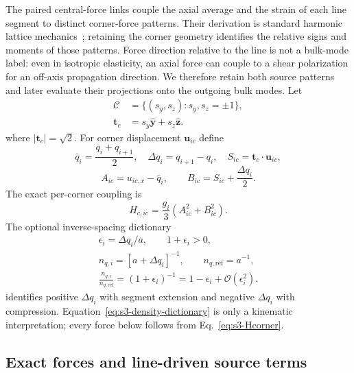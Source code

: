 \documentclass[10pt,aps,pre,reprint,floatfix,notitlepage,nofootinbib]{revtex4-2}
\newcommand{\vu}{\bm{u}}
\newcommand{\vt}{\bm{t}}
\newcommand{\ey}{\hat{\bm{y}}}
\newcommand{\ez}{\hat{\bm{z}}}
\newcommand{\order}{\mathcal O}
\newcommand{\Cc}{\mathcal C}
\begin{document}
The paired central-force links couple the axial average and the strain of each line segment to distinct corner-force patterns. Their derivation is standard harmonic lattice mechanics~\cite{BornHuang1954,Maradudin1971}; retaining the corner geometry identifies the relative signs and moments of those patterns. Force direction relative to the line is not a bulk-mode label: even in isotropic elasticity, an axial force can couple to a shear polarization for an off-axis propagation direction. We therefore retain both source patterns and later evaluate their projections onto the outgoing bulk modes. Let
\begin{align}
  \Cc&=\{(s_y,s_z):s_y,s_z=\pm1\},\\
  \vt_c&=s_y\ey+s_z\ez.
  \label{eq:s3-corners}
\end{align}
where $|\vt_c|=\sqrt2$.  For corner displacement $\vu_{ic}$ define
\begin{equation}
  \bar q_i=\frac{q_i+q_{i+1}}{2},
  \quad
  \Delta q_i=q_{i+1}-q_i,
  \quad
  S_{ic}=\vt_c\!\cdot\vu_{ic},
  \label{eq:s3-kinematic-defs}
\end{equation}
\begin{equation}
  A_{ic}=u_{ic,x}-\bar q_i,
  \qquad
  B_{ic}=S_{ic}+\frac{\Delta q_i}{2}.
  \label{eq:s3-AB}
\end{equation}
The exact per-corner coupling is
\begin{equation}
  H_{c,ic}=\frac{g_i}{3}\left(A_{ic}^{2}+B_{ic}^{2}\right).
  \label{eq:s3-Hcorner}
\end{equation}
The optional inverse-spacing dictionary
\begin{equation}
\begin{gathered}
  \epsilon_i=\Delta q_i/a,
  \qquad 1+\epsilon_i>0,\\
  n_{q,i}=[a+\Delta q_i]^{-1},
  \qquad n_{q,\mathrm{ref}}=a^{-1},\\
  \frac{n_{q,i}}{n_{q,\mathrm{ref}}}
  =(1+\epsilon_i)^{-1}
  =1-\epsilon_i+\order(\epsilon_i^2).
\end{gathered}
\label{eq:s3-density-dictionary}
\end{equation}
identifies positive $\Delta q_i$ with segment extension and negative $\Delta q_i$ with compression.  Equation~\eqref{eq:s3-density-dictionary} is only a kinematic interpretation; every force below follows from Eq.~\eqref{eq:s3-Hcorner}.

\subsection{Exact forces and line-driven source terms}
\label{sec:s3-forces}
\end{document}
